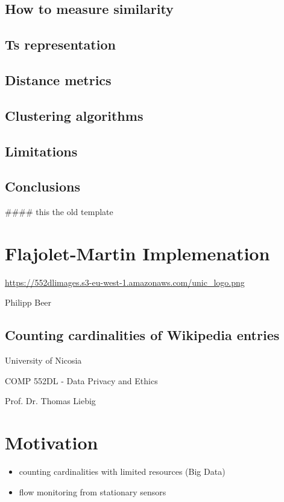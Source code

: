 \documentclass[11pt]{article}
\begin{document}
\subsection*{How to measure similarity}
\label{sec:org54cd60f}
\subsection*{Ts representation}
\label{sec:org9d8aedf}
\subsection*{Distance metrics}
\label{sec:org50d233d}
\subsection*{Clustering algorithms}
\label{sec:org99fb8e8}
\subsection*{Limitations}
\label{sec:orgf00b172}
\subsection*{Conclusions}
\label{sec:org0eba474}

\#\#\#\# this the old template

\section*{Flajolet-Martin Implemenation}
\label{sec:org97e4cf6}
\url{https://552dlimages.s3-eu-west-1.amazonaws.com/unic\_logo.png}

Philipp Beer
\subsection*{Counting cardinalities of Wikipedia entries}
\label{sec:org50d2da2}

University of Nicosia

COMP 552DL - Data Privacy and Ethics

Prof. Dr. Thomas Liebig
\section*{Motivation}
\label{sec:orga68a06d}
\begin{itemize}
\item counting cardinalities with limited resources (Big Data)
\item flow monitoring from stationary sensors
\end{itemize}
\end{document}
